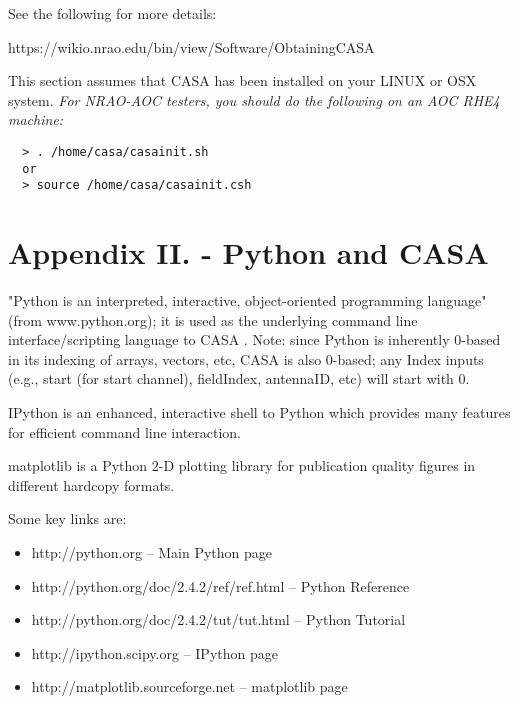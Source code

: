 See the following for more details:

https://wikio.nrao.edu/bin/view/Software/ObtainingCASA

\vspace{3mm}

This section assumes that CASA has been installed on your LINUX or OSX
system. {\it For NRAO-AOC testers, you should do the following on an AOC
RHE4 machine:} 

\small
\begin{verbatim}
  > . /home/casa/casainit.sh
  or
  > source /home/casa/casainit.csh
\end{verbatim}
\normalsize


\chapter{Appendix II. - Python and CASA}
\label{chapter:app.2}

\vspace{3mm}

"Python is an interpreted, interactive, object-oriented programming
language" (from www.python.org); it is used as the underlying command
line interface/scripting language to CASA . Note: since Python is
inherently 0-based in its indexing of arrays, vectors, etc, CASA is
also 0-based; any Index inputs (e.g., start (for start channel),
fieldIndex, antennaID, etc) will start with 0.

IPython is an enhanced, interactive shell to Python which provides
many features for efficient command line interaction.

matplotlib is a Python 2-D plotting library for publication quality
figures in different hardcopy formats.

Some key links are:

\begin{itemize}
   \item http://python.org  --  Main Python page
   \item http://python.org/doc/2.4.2/ref/ref.html  --  Python Reference
   \item http://python.org/doc/2.4.2/tut/tut.html  --  Python Tutorial
   \item http://ipython.scipy.org  --  IPython page
   \item http://matplotlib.sourceforge.net  --  matplotlib page
\end{itemize}

